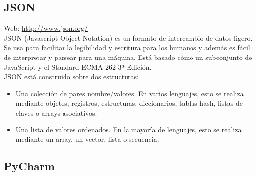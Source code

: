 \subsection{JSON}

Web: \url{http://www.json.org/}\\

JSON (Javascript Object Notation) es un formato de intercambio de datos ligero. Se usa para facilitar la legibilidad y escritura para los humanos y además es fácil de interpretar y parsear para una máquina. Está basado cómo un subconjunto de JavaScript y el Standard ECMA-262 3ª Edición. \\

JSON está construido sobre dos estructuras:

\begin{itemize}
\item Una colección de pares nombre/valores. En varios lenguajes, esto se realiza mediante objetos, registros, estructuras, diccionarios, tablas hash, listas de claves o arrays asociativos.
\item Una lista de valores ordenados. En la mayoría de lenguajes, esto se realiza mediante un array, un vector, lista o secuencia.
\end{itemize}

\subsection{PyCharm}


